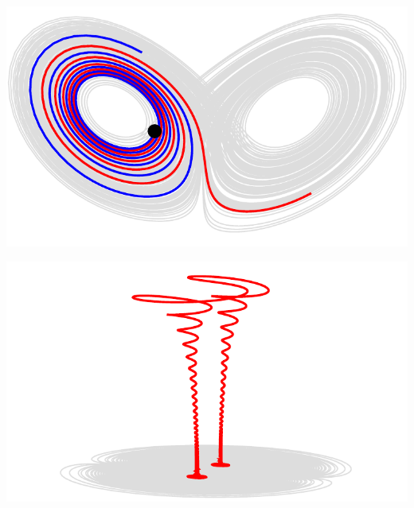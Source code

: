\topline
\begin{center}
  \includegraphics[width=\textwidth]{i/lor.pdf}
\end{center}
\eframe

\topline
\begin{center}
  \includegraphics[width=\textwidth]{i/far.pdf}
\end{center}
\eframe

